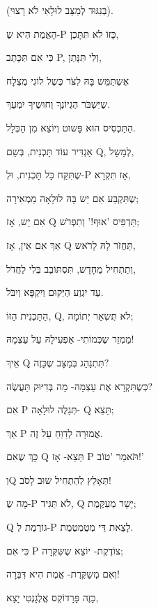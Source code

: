 {(בְּנִגּוּד לְמַצָּב לוּלָאִי לֹא רָצוּי).
\leavevmode
\newline


הָאֱמֶת הִיא שֶ-P כָּזוֹ לֹא תִּתָּכֵן,

כִּי אִם תִּכָּתֵב P, וְלִי תִּנָּתֵן,

אֶשְתַּמֵּש בָּהּ לִצֹּר כֶּשֶל לוֹגִי מֻצְלָח

שֶיִּשְבֹּר הֶגְיוֹנְךָ וְחוּשֶיךָ יִמְעַךְ.
\leavevmode
\newline


הַתַּכְסִיס הוּא פָּשוּט וְיוֹצֵא מִן הַכְּלָל.

אַגְדִּיר עוֹד תָּכְנִית, בְּשֵם Q, לְמָשָל,

שֶתִּקַּח כָּל תָּכְנִית, וּלְ-P אָז תִּקְרָא,

שֶתִּקְבַּע אִם יֵש בָּהּ לוּלָאָה מַמְאִירָה;
\leavevmode
\newline


אִם יֵש, אָז Q תַּדְפִּיס 'אוּף!' וְתִפְרֹש;

אַךְ אִם אֵין, אָז Q תַּחֲזֹר לָהּ לָרֹאש,

וְתַתְחִיל מֵחָדָש, תִּסְתּוֹבֵב בְּלִי לַחֲדֹל,

עַד יִגְוַע הַיְּקוּם וְיִקְפָּא וְיִבֹּל.

\leavevmode
\newline

הַתָּכְנִית הַזּוֹ, Q, לֹא תֻּשְאַר יְתוֹמָה;

מַמְזֵר שֶכְּמוֹתִי- אַפְעִילָהּ עַל עַצְמָהּ!

אֵיךְ Q תִּתְנַהֵג בְּמַצָּב שֶכָּזֶה?

כְּשֶתִּקְרָא אֶת עַצְמָהּ- מָה בְּדִיּוּק תַּעֲשֶׂה?
\leavevmode
\newline


אִם P תְּגַלֶּה לוּלָאָה- Q תֵּצֵא;

אַךְ P אֲמוּרָה לְדַוֵּחַ עַל זֶה.

כָּךְ שֶאִם Q תֵּצֵא- אָז P תֹּאמַר 'טוֹב!'

וְQ תֵּאָלֵץ לְהַתְחִיל שוּב לָסֹב!
\leavevmode
\newline


מָה שֶ-P לֹא תַּגִּיד, Q יָשָר מְעַקֶּמֶת;

Q גוֹרֶמֶת לְ-P לָצֵאת דֵּי מְטֻמְטֶמֶת.

כִּי אִם P צוֹדֶקֶת- יוֹצֵא שֶשִּקְּרָה;
\leavevmode
\newline


וְאִם מְשַקֶּרֶת- אֱמֶת הִיא דִּבְּרָה!

כָּזֶה פָּרָדוֹקְס אֱלֶגָנְטִי יָצָא,

}

